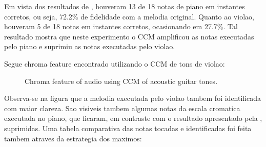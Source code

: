 \documentclass{article}
\begin{document}
	
	Em vista dos resultados de , houveram 13 de 18 notas de piano em instantes corretos, ou seja, 72.2\% de fidelidade com a melodia original. Quanto ao violao, houveram 5 de 18 notas em instantes corretos, ocasionando em 27.7\%. Tal resultado mostra que neste experimento o CCM amplificou as notas executadas pelo piano e suprimiu as notas executadas pelo violao.



Segue chroma feature encontrado utilizando o CCM de tons de violao:
	
	\begin{figure}[h]
	 \centerline{}
	 \caption{Chroma feature of audio using CCM of acoustic guitar tones.}
	 \label{fig:2-ccm-violao}
	\end{figure}	

	Observa-se na figura  que a melodia executada pelo violao tambem foi identificada com maior clareza. Sao visiveis tambem algumas notas da escala cromatica executada no piano, que ficaram, em contraste com o resultado apresentado pela , suprimidas. Uma tabela comparativa das notas tocadas e identificadas foi feita tambem atraves da estrategia dos maximos:
\end{document}
